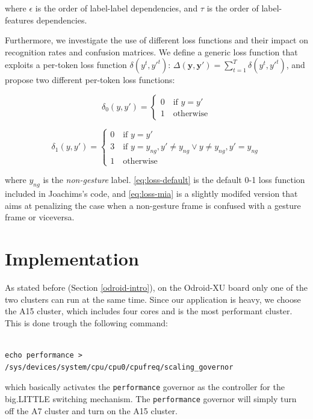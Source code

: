 where $\epsilon$ is the order of label-label dependencies, and $\tau$ is the order of label-features dependencies.

Furthermore, we investigate the use of different loss functions and their impact on recognition rates and confusion matrices. We define a generic loss function that exploits a per-token loss function $\delta(y^t,y'^t)$: $\Delta(\mathbf{y},\mathbf{y'}) = \sum_{t=1}^T \delta(y^t,y'^t)$, and propose two different per-token loss functions:

\begin{equation}
\delta_0(y,y') = \begin{cases} 0 \quad \text{if } y= y'  \\ 
1 \quad \text{otherwise}\end{cases}
\label{eq:loss-default}
\end{equation}

\begin{equation}
\delta_1(y,y') = \begin{cases} 0 \quad \text{if } y= y'  \\ 
3 \quad \text{if } y=y_{ng}, y' \neq y_{ng} \lor y\neq y_{ng}, y'=y_{ng}  \\
1 \quad \text{otherwise}\end{cases}
\label{eq:loss-mia}
\end{equation}

where $y_{ng}$ is the \textit{non-gesture} label. \ref{eq:loss-default} is the default 0-1 loss function included in Joachims's code, and \ref{eq:loss-mia} is a slightly modifed version that aims at penalizing the case when a non-gesture frame is confused with a gesture frame or viceversa.




\section{Implementation}
\lstset{language=C++}

As stated before (Section \ref{odroid-intro}), on the Odroid-XU board only one of the two clusters can run at the same time. Since our application is heavy, we choose the A15 cluster, which includes four cores and is the most performant cluster. This is done trough the following command:
\begin{lstlisting}[frame=single]  % Start your code-block

echo performance > /sys/devices/system/cpu/cpu0/cpufreq/scaling_governor
\end{lstlisting}
which basically activates the \verb+performance+ governor as the controller for the big.LITTLE switching mechanism. The \verb+performance+ governor will simply turn off the A7 cluster and turn on the A15 cluster.

